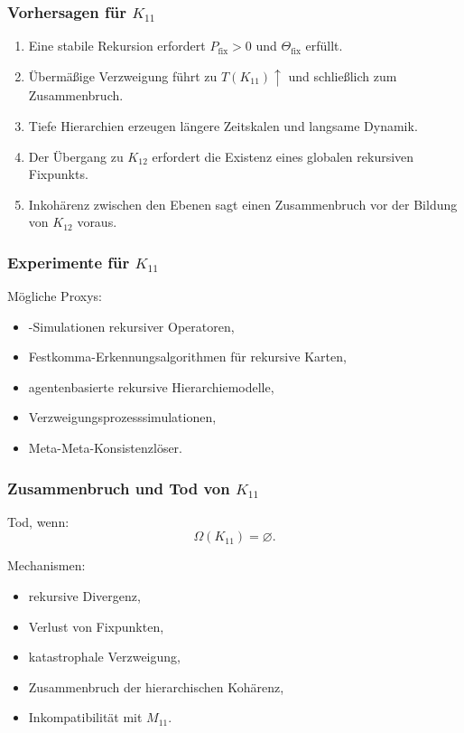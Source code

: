 \subsubsection{Vorhersagen für $K_{11}$}

\begin{enumerate}
    \item Eine stabile Rekursion erfordert $P_{\mathrm{fix}}>0$ und $\Theta_{\mathrm{fix}}$ erfüllt.
    \item Übermäßige Verzweigung führt zu $T(K_{11})\uparrow$ und schließlich zum Zusammenbruch.
    \item Tiefe Hierarchien erzeugen längere Zeitskalen und langsame Dynamik.
    \item Der Übergang zu $K_{12}$ erfordert die Existenz eines globalen rekursiven Fixpunkts.
    \item Inkohärenz zwischen den Ebenen sagt einen Zusammenbruch vor der Bildung von $K_{12}$ voraus.
\end{enumerate}

\subsubsection{Experimente für $K_{11}$}

Mögliche Proxys:
\begin{itemize}
    \item-Simulationen rekursiver Operatoren,
    \item Festkomma-Erkennungsalgorithmen für rekursive Karten,
    \item agentenbasierte rekursive Hierarchiemodelle,
    \item Verzweigungsprozesssimulationen,
    \item Meta-Meta-Konsistenzlöser.
\end{itemize}

\subsubsection{Zusammenbruch und Tod von $K_{11}$}

Tod, wenn:
\[
\Omega(K_{11})=\varnothing.
\]

Mechanismen:
\begin{itemize}
    \item rekursive Divergenz,
    \item Verlust von Fixpunkten,
    \item katastrophale Verzweigung,
    \item Zusammenbruch der hierarchischen Kohärenz,
    \item Inkompatibilität mit $M_{11}$.
\end{itemize}


